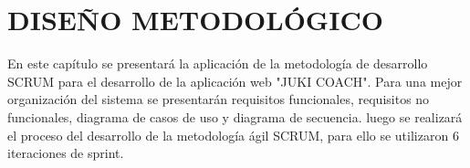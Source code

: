 \newpage
\chapter{DISEÑO METODOLÓGICO}

En este capítulo se presentará la aplicación de la metodología de desarrollo SCRUM para el desarrollo de la aplicación web "JUKI COACH".
Para una mejor organización del sistema se presentarán requisitos funcionales, requisitos no funcionales, diagrama de casos de uso y diagrama de secuencia. luego se realizará el proceso del desarrollo de la metodología ágil SCRUM, para ello se utilizaron 6 iteraciones de sprint.
